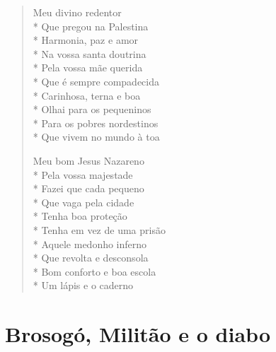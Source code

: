 \begin{verse}
Meu divino redentor\\*
Que pregou na Palestina\\*
Harmonia, paz e amor\\*
Na vossa santa doutrina\\*
Pela vossa mãe querida\\*
Que é sempre compadecida\\*
Carinhosa, terna e boa\\*
Olhai para os pequeninos\\*
Para os pobres nordestinos\\*
Que vivem no mundo à toa

Meu bom Jesus Nazareno\\*
Pela vossa majestade\\*
Fazei que cada pequeno\\*
Que vaga pela cidade\\*
Tenha boa proteção\\*
Tenha em vez de uma prisão\\*
Aquele medonho inferno\\*
Que revolta e desconsola\\*
Bom conforto e boa escola\\*
Um lápis e o caderno
\end{verse}

\chapter{Brosogó, Militão e o diabo}

